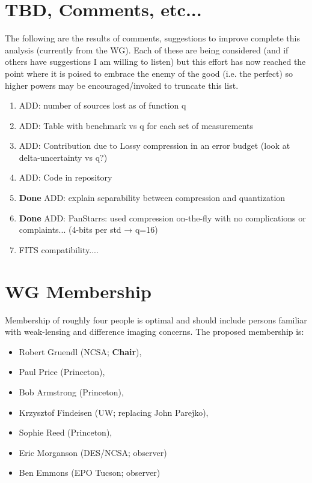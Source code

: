 \newpage
\section{TBD, Comments, etc...}\label{sec_tbd}

The following are the results of comments, suggestions to improve complete this analysis (currently from the WG).  
Each of these are being considered (and if others have suggestions I am willing to listen) but this effort has now reached 
the point where it is poised to embrace the enemy of the good (i.e. the perfect) so higher powers may be encouraged/invoked to truncate this list.

\begin{enumerate}
\item ADD:  number of sources lost as of function q
\item ADD:  Table with benchmark vs q for each set of measurements
\item ADD:  Contribution due to Lossy compression in an error budget (look at delta-uncertainty vs q?)
\item ADD:  Code in repository
\item {\bf Done}  ADD: explain separability between compression and quantization
\item {\bf Done} ADD: PanStarrs: used compression on-the-fly with no complications or complaints...  (4-bits per std → q=16)
\item FITS compatibility.... 
\end{enumerate}


\section{WG Membership}

Membership of roughly four people is optimal and should include persons familiar 
with weak-lensing and difference imaging concerns.
The proposed membership is:

\begin{itemize}
    \item Robert Gruendl (NCSA; \textbf{Chair}),
    \item Paul Price (Princeton),
    \item Bob Armstrong (Princeton),
    \item Krzysztof Findeisen (UW; replacing John Parejko),
    \item Sophie Reed (Princeton),
    \item Eric Morganson (DES/NCSA; observer)
    \item Ben Emmons (EPO Tucson; observer)
\end{itemize}

